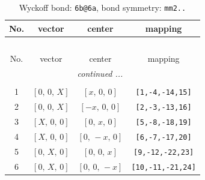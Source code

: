 \documentclass[fleqn,8pt]{jsarticle}
\begin{document}
\begin{longtable}{cccc}
\caption{Wyckoff bond: {\tt 6b@6a}, bond symmetry: {\tt mm2..}}
 \\
 \hline \hline
No. & vector & center & mapping \\ \hline \endfirsthead

\multicolumn{3}{l}{\tablename\ \thetable{}} \\
 \hline \hline
No. & vector & center & mapping \\ \hline \endhead

 \hline \hline
\multicolumn{3}{r}{\footnotesize\it continued ...} \\ \endfoot

 \hline \hline
\multicolumn{3}{r}{} \\ \endlastfoot

1 & $\left[ 0,\, 0,\, X \right]$ & $\left[ x,\, 0,\, 0 \right]$ & {\tt [1,-4,-14,15]} \\ \hline
2 & $\left[ 0,\, 0,\, X \right]$ & $\left[ - x,\, 0,\, 0 \right]$ & {\tt [2,-3,-13,16]} \\ \hline
3 & $\left[ X,\, 0,\, 0 \right]$ & $\left[ 0,\, x,\, 0 \right]$ & {\tt [5,-8,-18,19]} \\ \hline
4 & $\left[ X,\, 0,\, 0 \right]$ & $\left[ 0,\, - x,\, 0 \right]$ & {\tt [6,-7,-17,20]} \\ \hline
5 & $\left[ 0,\, X,\, 0 \right]$ & $\left[ 0,\, 0,\, x \right]$ & {\tt [9,-12,-22,23]} \\ \hline
6 & $\left[ 0,\, X,\, 0 \right]$ & $\left[ 0,\, 0,\, - x \right]$ & {\tt [10,-11,-21,24]} \\
\end{longtable}
\renewcommand{\arraystretch}{1.2}
\end{document}
